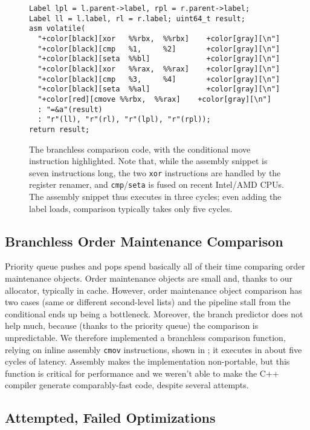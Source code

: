 \begin{figure}
\begin{Verbatim}[formatcom=\color{gray}, commandchars={+[]}]
Label lpl = l.parent->label, rpl = r.parent->label;
Label ll = l.label, rl = r.label; uint64_t result;
asm volatile(
  "+color[black][xor   %%rbx,  %%rbx]    +color[gray][\n"]
  "+color[black][cmp   %1,     %2]       +color[gray][\n"]
  "+color[black][seta  %%bl]             +color[gray][\n"]
  "+color[black][xor   %%rax,  %%rax]    +color[gray][\n"]
  "+color[black][cmp   %3,     %4]       +color[gray][\n"]
  "+color[black][seta  %%al]             +color[gray][\n"]
  "+color[red][cmove %%rbx,  %%rax]    +color[gray][\n"]
  : "=&a"(result)
  : "r"(ll), "r"(rl), "r"(lpl), "r"(rpl));
return result;
\end{Verbatim}
\caption{
  The branchless comparison code,
    with the conditional move instruction highlighted.
  Note that, while the assembly snippet
    is seven instructions long,
    the two \texttt{xor} instructions
    are handled by the register renamer,
    and \texttt{cmp}/\texttt{seta} is fused on recent Intel/AMD CPUs.
  The assembly snippet thus executes in three cycles;
    even adding the label loads,
    comparison typically takes only five cycles.
}
\label{fig:compare}
\end{figure}

\subsection{Branchless Order Maintenance Comparison}

Priority queue pushes and pops spend basically all of their time
  comparing order maintenance objects.
Order maintenance objects are small and,
  thanks to our allocator, typically in cache.
However, order maintenance object comparison has two cases
  (same or different second-level lists)
  and the pipeline stall from the conditional
  ends up being a bottleneck.
Moreover, the branch predictor does not help much,
  because (thanks to the priority queue)
  the comparison is unpredictable.
We therefore implemented a branchless comparison function,
  relying on inline assembly \texttt{cmov} instructions,
  shown in ;
  it executes in about five cycles of latency.
Assembly makes the implementation non-portable,
  but this function is critical for performance
  and we weren't able to make the C++ compiler
  generate comparably-fast code, despite several attempts.

\subsection{Attempted, Failed Optimizations}

